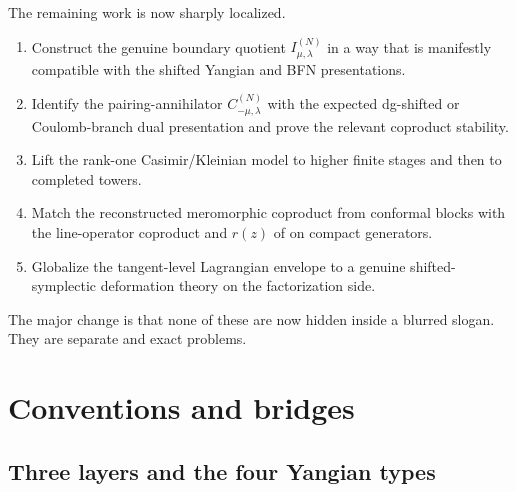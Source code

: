\begin{remark}
\label{rem:what-remains-open}
The remaining work is now sharply localized.
\begin{enumerate}[label=\textup{(\roman*)}]
\item Construct the genuine boundary quotient $I_{\mu,\lambda}^{(N)}$ in a way that
 is manifestly compatible with the shifted Yangian and BFN presentations.
\item Identify the pairing-annihilator $C_{-\mu,\lambda}^{(N)}$ with the
 expected dg-shifted or Coulomb-branch dual presentation and prove the
 relevant coproduct stability.
\item Lift the rank-one Casimir/Kleinian model to higher finite stages and then
 to completed towers.
\item Match the reconstructed meromorphic coproduct from conformal blocks with
 the line-operator coproduct and $r(z)$ of \cite{DNP25} on compact generators.
\item Globalize the tangent-level Lagrangian envelope to a genuine shifted-
 symplectic deformation theory on the factorization side.
\end{enumerate}
The major change is that none of these are now hidden inside a blurred slogan.
They are separate and exact problems.
\end{remark}

\section{Conventions and bridges}
\label{sec:shifted-rtt-conventions}

\subsection{Three layers and the four Yangian types}
\label{subsec:shifted-rtt-yangian-types}

